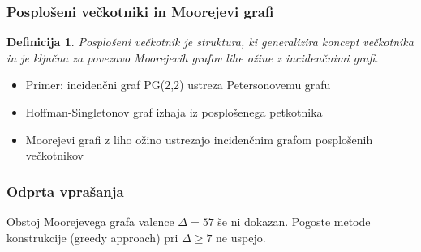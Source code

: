 \documentclass{beamer}
\newtheorem{definicija}[izrek]{Definicija}
\begin{document}
\begin{frame}
\frametitle{Posplošeni večkotniki in Moorejevi grafi}
\begin{definicija}
Posplošeni večkotnik je struktura, ki generalizira koncept večkotnika in je ključna za povezavo Moorejevih grafov lihe ožine z incidenčnimi grafi.
\end{definicija}

\begin{itemize}
\item Primer: incidenčni graf PG(2,2) ustreza Petersonovemu grafu
\item Hoffman-Singletonov graf izhaja iz posplošenega petkotnika
\item Moorejevi grafi z liho ožino ustrezajo incidenčnim grafom posplošenih večkotnikov
\end{itemize}
\end{frame}

\begin{frame}
\frametitle{Odprta vprašanja}
Obstoj Moorejevega grafa valence \(\Delta=57\) še ni dokazan.  
Pogoste metode konstrukcije (greedy approach) pri \(\Delta \ge 7\) ne uspejo.
\end{frame}
\end{document}
